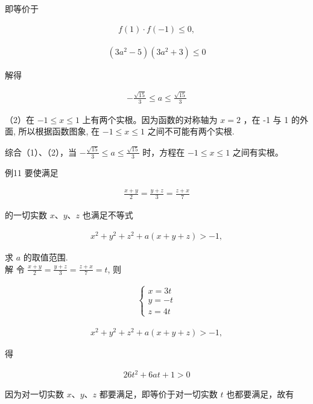 \documentclass[10pt]{article}
\begin{document}
即等价于

\begin{align*}
f(1) \cdot f(-1) \leqslant 0,
\end{align*}

\begin{align*}
\left(3 a^{2}-5\right)\left(3 a^{2}+3\right) \leqslant 0
\end{align*}

解得

\begin{align*}
-\frac{\sqrt{15}}{3} \leqslant a \leqslant \frac{\sqrt{15}}{3}
\end{align*}

（2）在 $-1 \leqslant x \leqslant 1$ 上有两个实根。因为函数的对称轴为 $x=2$ ，在 -1 与 1 的外面, 所以根据函数图象, 在 $-1 \leqslant x \leqslant 1$ 之间不可能有两个实根.

综合（1）、（2），当 $-\frac{\sqrt{15}}{3} \leqslant a \leqslant \frac{\sqrt{15}}{3}$ 时，方程在 $-1 \leqslant x \leqslant 1$ 之间有实根。

例11 要使满足

\begin{align*}
\frac{x+y}{2}=\frac{y+z}{3}=\frac{z+x}{7}
\end{align*}

的一切实数 $x 、 y 、 z$ 也满足不等式

\begin{align*}
x^{2}+y^{2}+z^{2}+a(x+y+z)>-1,
\end{align*}

求 $a$ 的取值范围.\\
解 令 $\frac{x+y}{2}=\frac{y+z}{3}=\frac{z+x}{7}=t$, 则

\begin{align*}
\left\{\begin{array}{l}
x=3 t \\
y=-t \\
z=4 t
\end{array}\right.
\end{align*}

\begin{align*}
x^{2}+y^{2}+z^{2}+a(x+y+z)>-1,
\end{align*}

得

\begin{align*}
26 t^{2}+6 a t+1>0
\end{align*}

因为对一切实数 $x 、 y 、 z$ 都要满足，即等价于对一切实数 $t$ 也都要满足，故有
\end{document}
